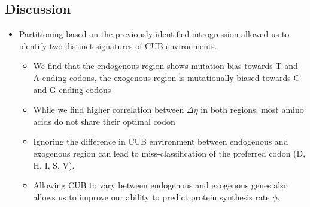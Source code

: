 \documentclass[12pt]{article}
\begin{document}
\subsection*{Discussion}

\begin{itemize}
	\item Partitioning \kluyveri based on the previously identified introgression allowed us to identify two distinct signatures of CUB environments.
	\begin{itemize}
		\item We find that the endogenous region shows mutation bias towards T and A ending codons, the exogenous region is mutationally biased towards C and G ending codons %
		\item While we find higher correlation between $\Delta \eta$ in both regions, most amino acids do not share their optimal codon %
		\item Ignoring the difference in CUB environment between endogenous and exogenous region can lead to miss-classification of the preferred codon (D, H, I, S, V).
		\item Allowing CUB to vary between endogenous and exogenous genes also allows us to improve our ability to predict protein synthesis rate $\phi$.

\end{itemize}
\end{itemize}
\end{document}
